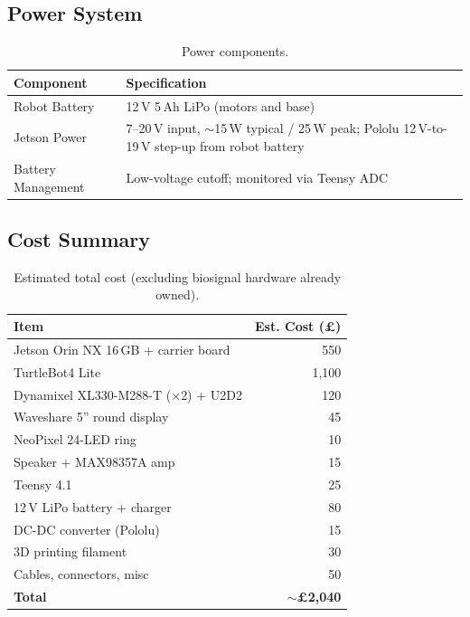 \documentclass[11pt,a4paper]{article}
\begin{document}
\subsection{Power System}

\begin{table}[H]
\centering
\caption{Power components.}
\label{tab:power}
\begin{tabularx}{\textwidth}{lX}
\toprule
\textbf{Component} & \textbf{Specification} \\
\midrule
Robot Battery & 12\,V 5\,Ah LiPo (motors and base) \\
Jetson Power & 7--20\,V input, $\sim$15\,W typical / 25\,W peak; Pololu 12\,V-to-19\,V step-up from robot battery \\
Battery Management & Low-voltage cutoff; monitored via Teensy ADC \\
\bottomrule
\end{tabularx}
\end{table}

\subsection{Cost Summary}

\begin{table}[H]
\centering
\caption{Estimated total cost (excluding biosignal hardware already owned).}
\label{tab:cost}
\begin{tabular}{lr}
\toprule
\textbf{Item} & \textbf{Est. Cost (£)} \\
\midrule
Jetson Orin NX 16\,GB + carrier board & 550 \\
TurtleBot4 Lite & 1,100 \\
Dynamixel XL330-M288-T ($\times$2) + U2D2 & 120 \\
Waveshare 5'' round display & 45 \\
NeoPixel 24-LED ring & 10 \\
Speaker + MAX98357A amp & 15 \\
Teensy 4.1 & 25 \\
12\,V LiPo battery + charger & 80 \\
DC-DC converter (Pololu) & 15 \\
3D printing filament & 30 \\
Cables, connectors, misc & 50 \\
\midrule
\textbf{Total} & \textbf{$\sim$£2,040} \\
\bottomrule
\end{tabular}
\end{table}
\end{document}
